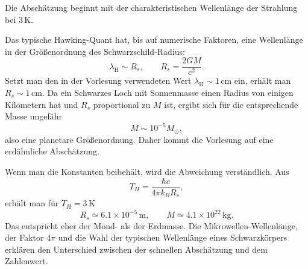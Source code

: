 Die Abschätzung beginnt mit der charakteristischen Wellenlänge der Strahlung bei \(3\,\mathrm{K}\).

\begin{classroomqa}
\end{classroomqa}

Das typische Hawking-Quant hat, bis auf numerische Faktoren, eine Wellenlänge in der Größenordnung des Schwarzschild-Radius:
\begin{equation}
\lambda_{\mathrm{H}}\sim R_s,
\qquad
R_s=\frac{2GM}{c^2}.
\label{eq:l05-scale}
\end{equation}
Setzt man den in der Vorlesung verwendeten Wert \(\lambda_{\mathrm H}\sim1\,\mathrm{cm}\) ein, erhält man \(R_s\sim1\,\mathrm{cm}\). Da ein Schwarzes Loch mit Sonnenmasse einen Radius von einigen Kilometern hat und \(R_s\) proportional zu \(M\) ist, ergibt sich für die entsprechende Masse ungefähr
\begin{equation}
M\sim10^{-5}M_\odot,
\label{eq:l05-rough-mass}
\end{equation}
also eine planetare Größenordnung. Daher kommt die Vorlesung auf eine erdähnliche Abschätzung.

\begin{classroomqa}
\end{classroomqa}

Wenn man die Konstanten beibehält, wird die Abweichung verständlich. Aus
\begin{equation}
T_H=\frac{\hbar c}{4\pi k_B R_s},
\end{equation}
erhält man für \(T_H=3\,\mathrm{K}\)
\begin{equation}
R_s\simeq6.1\times10^{-5}\,\mathrm{m},
\qquad
M\simeq4.1\times10^{22}\,\mathrm{kg}.
\label{eq:l05-three-kelvin}
\end{equation}
Das entspricht eher der Mond- als der Erdmasse. Die Mikrowellen-Wellenlänge, der Faktor \(4\pi\) und die Wahl der typischen Wellenlänge eines Schwarzkörpers erklären den Unterschied zwischen der schnellen Abschätzung und dem Zahlenwert.

